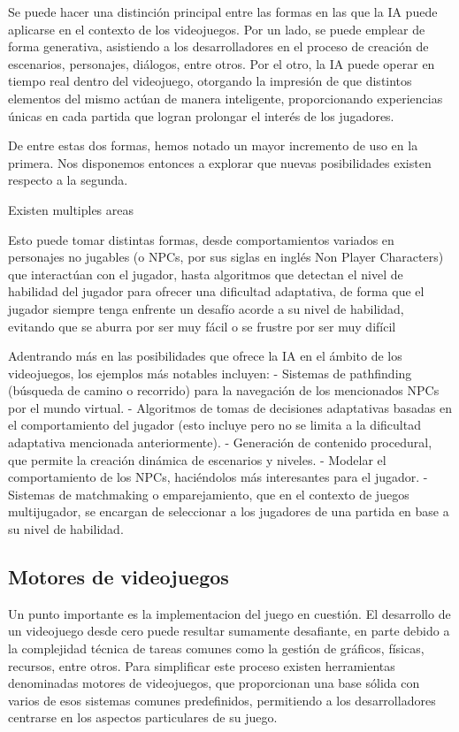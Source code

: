 \documentclass{article}
\begin{document}
Se puede hacer una distinción principal entre las formas en las que la IA puede aplicarse en el contexto de los videojuegos. Por un lado, se puede emplear de forma generativa, asistiendo a los desarrolladores en el proceso de creación de escenarios, personajes, diálogos, entre otros. Por el otro, la IA puede operar en tiempo real dentro del videojuego, otorgando la impresión de que distintos elementos del mismo actúan de manera inteligente, proporcionando experiencias únicas en cada partida que logran prolongar el interés de los jugadores.

De entre estas dos formas, hemos notado un mayor incremento de uso en la primera. Nos disponemos entonces a explorar que nuevas posibilidades existen respecto a la segunda.

Existen multiples areas 

Esto puede tomar distintas formas, desde comportamientos variados en personajes no jugables (o NPCs, por sus siglas en inglés Non Player Characters) que interactúan con el jugador, hasta algoritmos que detectan el nivel de habilidad del jugador para ofrecer una dificultad adaptativa, de forma que el jugador siempre tenga enfrente un desafío acorde a su nivel de habilidad, evitando que se aburra por ser muy fácil o se frustre por ser muy difícil \cite{recent_research_on_ai_in_games}

Adentrando más en las posibilidades que ofrece la IA en el ámbito de los videojuegos, los ejemplos más notables incluyen:
-	Sistemas de pathfinding (búsqueda de camino o recorrido) para la navegación de los mencionados NPCs por el mundo virtual.
-	Algoritmos de tomas de decisiones adaptativas basadas en el comportamiento del jugador (esto incluye pero no se limita a la dificultad adaptativa mencionada anteriormente).
-	Generación de contenido procedural, que permite la creación dinámica de escenarios y niveles.
-	Modelar el comportamiento de los NPCs, haciéndolos más interesantes para el jugador.
-	Sistemas de matchmaking o emparejamiento, que en el contexto de juegos multijugador, se encargan de seleccionar a los jugadores de una partida en base a su nivel de habilidad.

\subsection{Motores de videojuegos}

Un punto importante es la implementacion del juego en cuestión. El desarrollo de un videojuego desde cero puede resultar sumamente desafiante, en parte debido a la complejidad técnica de tareas comunes como la gestión de gráficos, físicas, recursos, entre otros. Para simplificar este proceso existen herramientas denominadas motores de videojuegos, que proporcionan una base sólida con varios de esos sistemas comunes predefinidos, permitiendo a los desarrolladores centrarse en los aspectos particulares de su juego.
\end{document}

